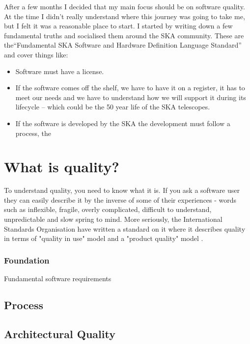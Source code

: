 \documentclass[11pt,twoside]{article}
\begin{document}
After a few months I decided that my main focus should be on software quality. At the time I didn't really understand where this journey was going to take me, but I felt it was a reasonable place to start. I started by writing down a few fundamental truths and socialised them around the SKA community. These are the``Fundamental SKA Software and Hardware Definition Language Standard'' and cover things like:
\begin{itemize}
\item Software must have a license.
\item If the software comes off the shelf, we have to have it on a register, it has to meet our needs and we have to understand how we will support it during its lifecycle -- which could be the 50 year life of the SKA telescopes.
\item If the software is developed by the SKA
 the development must follow a process, the 
\end{itemize}

\section{What is quality?}
To understand quality, you need to know what it is. If you ask a software user they can easily describe it by the inverse of some of their experiences - words such as inflexible, fragile, overly complicated, difficult to understand, unpredictable and slow spring to mind. More seriously, the International Standards Organisation have written a standard on it where it describes quality in terms of "quality in use" model and a "product quality" model \citep[See][]{iso25010}. 




\subsubsection{Foundation}
Fundamental software requirements
\subsection{Process}
\subsection{Architectural Quality}
\end{document}
